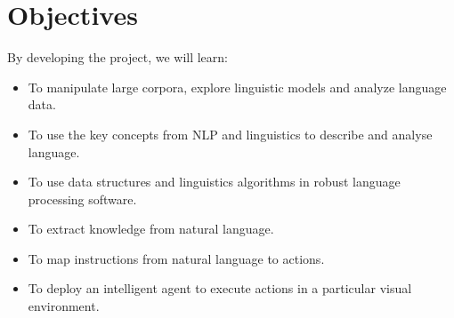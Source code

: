 \section{Objectives}
By developing the project, we will learn:
\begin{itemize}
    \item To manipulate large corpora, explore linguistic models and analyze language data.
    \item To use the key concepts from NLP and linguistics to describe and analyse language.
    \item To use data structures and linguistics algorithms in robust language processing software.
    \item To extract knowledge from natural language.
    \item To map instructions from natural language to actions.
    \item To deploy an intelligent agent to execute actions in a particular visual environment.
\end{itemize}





